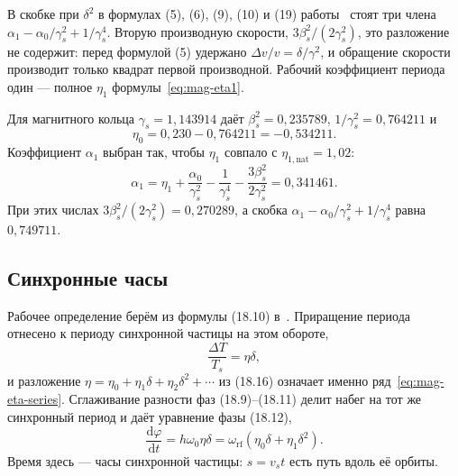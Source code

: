 В скобке при $\delta^2$ в формулах (5), (6), (9), (10) и (19) работы~\cite{Senichev2013} стоят три члена $\alpha_1-\alpha_0/\gamma_s^2+1/\gamma_s^4$. Вторую производную скорости, $3\beta_s^2/(2\gamma_s^2)$, это разложение не содержит: перед формулой (5) удержано $\Delta v/v=\delta/\gamma^2$, и обращение скорости производит только квадрат первой производной. Рабочий коэффициент периода один --- полное $\eta_1$ формулы~\eqref{eq:mag-eta1}.

Для магнитного кольца $\gamma_s=1{,}143914$ даёт $\beta_s^2=0{,}235789$, $1/\gamma_s^2=0{,}764211$ и
\begin{equation}
\label{eq:mag-eta0-num}
\eta_0=0{,}230-0{,}764211=-0{,}534211.
\end{equation}
Коэффициент $\alpha_1$ выбран так, чтобы $\eta_1$ совпало с $\eta_{1,\mathrm{nat}}=1{,}02$:
\begin{equation}
\label{eq:mag-alpha1-num}
\alpha_1
=\eta_1+\frac{\alpha_0}{\gamma_s^2}-\frac{1}{\gamma_s^4}-\frac{3\beta_s^2}{2\gamma_s^2}
=0{,}341461.
\end{equation}
При этих числах $3\beta_s^2/(2\gamma_s^2)=0{,}270289$, а скобка $\alpha_1-\alpha_0/\gamma_s^2+1/\gamma_s^4$ равна $0{,}749711$.

\subsection{Синхронные часы}
\label{sec:clocks}

Рабочее определение берём из формулы (18.10) в~\cite{Ng2006}. Приращение периода отнесено к периоду синхронной частицы на этом обороте,
\begin{equation}
\label{eq:mag-ng1810}
\frac{\Delta T}{T_s}=\eta\delta,
\end{equation}
и разложение $\eta=\eta_0+\eta_1\delta+\eta_2\delta^2+\cdots$ из (18.16) означает именно ряд~\eqref{eq:mag-eta-series}. Сглаживание разности фаз (18.9)--(18.11) делит набег на тот же синхронный период и даёт уравнение фазы (18.12),
\begin{equation}
\label{eq:mag-phase-slip}
\frac{\mathrm{d}\varphi}{\mathrm{d}t}=h\omega_0\eta\delta
=\omega_{\mathrm{rf}}(\eta_0\delta+\eta_1\delta^2).
\end{equation}
Время здесь --- часы синхронной частицы: $s=v_s t$ есть путь вдоль её орбиты.

